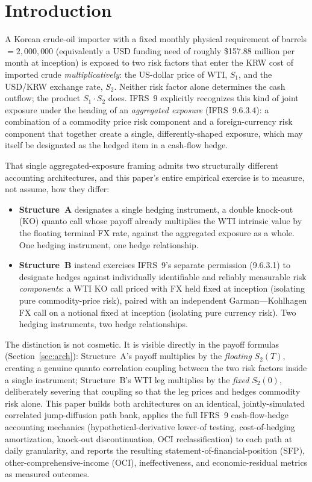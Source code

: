 \documentclass[11pt,a4paper]{article}
\begin{document}
\section{Introduction}
\label{sec:intro}

A Korean crude-oil importer with a fixed monthly physical requirement of barrels$=2{,}000{,}000$ (equivalently a USD funding need of roughly \$157.88 million per month at inception) is exposed to two risk factors that enter the KRW cost of imported crude \emph{multiplicatively}: the US-dollar price of WTI, $S_1$, and the USD/KRW exchange rate, $S_2$. Neither risk factor alone determines the cash outflow; the product $S_1\cdot S_2$ does. IFRS~9 explicitly recognizes this kind of joint exposure under the heading of an \emph{aggregated exposure} (IFRS~9.6.3.4): a combination of a commodity price risk component and a foreign-currency risk component that together create a single, differently-shaped exposure, which may itself be designated as the hedged item in a cash-flow hedge.

That single aggregated-exposure framing admits two structurally different accounting architectures, and this paper's entire empirical exercise is to measure, not assume, how they differ:

\begin{itemize}
\item \textbf{Structure~A} designates a single hedging instrument, a double knock-out (KO) quanto call whose payoff already multiplies the WTI intrinsic value by the floating terminal FX rate, against the aggregated exposure as a whole. One hedging instrument, one hedge relationship.
\item \textbf{Structure~B} instead exercises IFRS~9's separate permission (9.6.3.1) to designate hedges against individually identifiable and reliably measurable risk \emph{components}: a WTI KO call priced with FX held fixed at inception (isolating pure commodity-price risk), paired with an independent Garman---Kohlhagen FX call on a notional fixed at inception (isolating pure currency risk). Two hedging instruments, two hedge relationships.
\end{itemize}

The distinction is not cosmetic. It is visible directly in the payoff formulas (Section~\ref{sec:arch}): Structure~A's payoff multiplies by the \emph{floating} $S_2(T)$, creating a genuine quanto correlation coupling between the two risk factors inside a single instrument; Structure~B's WTI leg multiplies by the \emph{fixed} $S_2(0)$, deliberately severing that coupling so that the leg prices and hedges commodity risk alone. This paper builds both architectures on an identical, jointly-simulated correlated jump-diffusion path bank, applies the full IFRS~9 cash-flow-hedge accounting mechanics (hypothetical-derivative lower-of testing, cost-of-hedging amortization, knock-out discontinuation, OCI reclassification) to each path at daily granularity, and reports the resulting statement-of-financial-position (SFP), other-comprehensive-income (OCI), ineffectiveness, and economic-residual metrics as measured outcomes.
\end{document}
